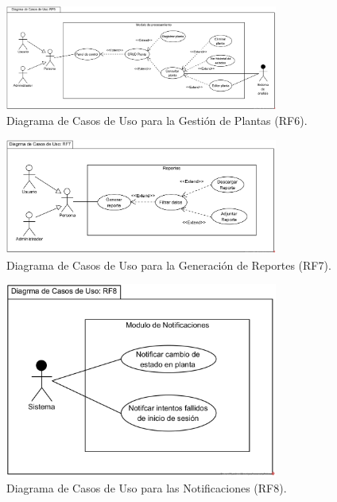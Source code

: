 \begin{figure}[H]
    \centering
    \caption{Diagrama de Casos de Uso para la Gestión de Plantas (RF6).}
    \label{fig:casos-uso-plantas}
    \includegraphics[width=0.8\textwidth]{UML/CasosUso/Diagrama de Casos de Uso RF6.png}
\end{figure}


\begin{figure}[H]
    \centering
    \caption{Diagrama de Casos de Uso para la Generación de Reportes (RF7).}
    \label{fig:casos-uso-reportes}
     \includegraphics[width=0.8\textwidth]{UML/CasosUso/Diagrama de Casos de Uso RF7.png}
\end{figure}


\begin{figure}[H]
    \centering
    \caption{Diagrama de Casos de Uso para las Notificaciones (RF8).}
    \label{fig:casos-uso-notificaciones}
    \includegraphics[width=0.8\textwidth]{UML/CasosUso/Diagrama de Casos de Uso RF8.png}
\end{figure}


